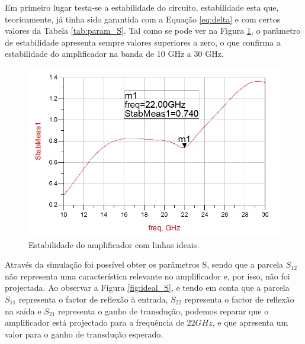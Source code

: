 \documentclass[11pt]{article}
\numberwithin{equation}{section}
\begin{document}
Em primeiro lugar testa-se a estabilidade do circuito, estabilidade esta que, teoricamente, já tinha sido garantida com a Equação \ref{eq:delta} e com certos valores da Tabela \ref{tab:param_S}. Tal como se pode ver na Figura \ref{fig:ideal_estavel}, o parâmetro de estabilidade apresenta sempre valores superiores a zero, o que confirma a estabilidade do amplificador na banda de 10 GHz a 30 GHz.

\begin{figure}[H]
	\centering
	\includegraphics[keepaspectratio=true, scale=0.45]{exps/Ideal_estab}
	\vspace{-0.5em}
	\caption{Estabilidade do amplificador com linhas ideais.}
	\vspace{-0.8em}
	\label{fig:ideal_estavel}
\end{figure}

Através da simulação foi possível obter os parâmetros S, sendo que a parcela $S_{12}$ não representa uma característica relevante no amplificador e, por isso, não foi projectada. Ao observar a Figura \ref{fig:ideal_S}, e tendo em conta que a parcela $S_{11}$ representa o factor de reflexão à entrada, $S_{22}$ representa o factor de reflexão na saída e $S_{21}$ representa o ganho de transdução, podemos reparar que o amplificador está projectado para a frequência de $ 22 GHz $, e que apresenta um valor para o ganho de transdução esperado.
\end{document}
